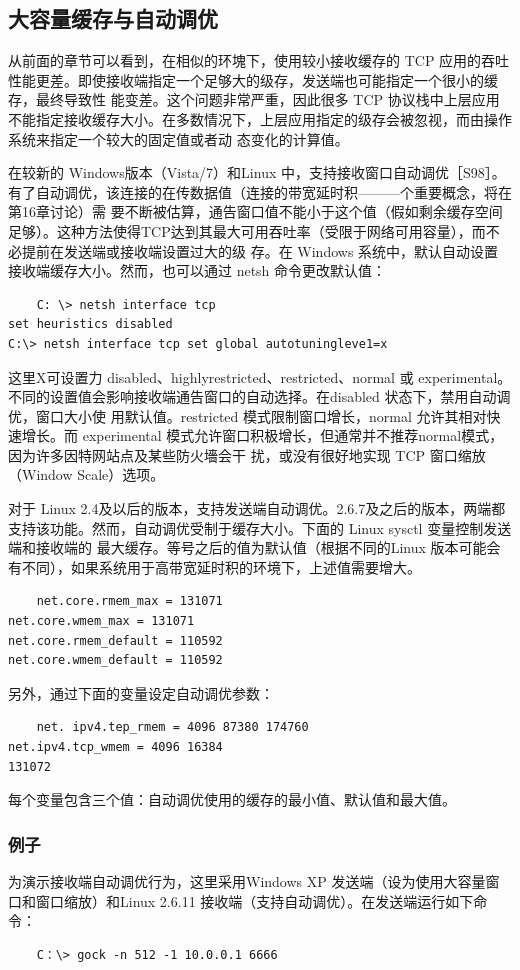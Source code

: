 \subsection{大容量缓存与自动调优}
从前面的章节可以看到，在相似的环塊下，使用较小接收缓存的 TCP 应用的吞吐性能更差。即使接收端指定一个足够大的级存，发送端也可能指定一个很小的缓存，最终导致性
能变差。这个问题非常严重，因此很多 TCP 协议栈中上层应用不能指定接收缓存大小。在多数情况下，上层应用指定的级存会被忽视，而由操作系统来指定一个较大的固定值或者动
态变化的计算值。

在较新的 Windows版本（Vista/7）和Linux 中，支持接收窗口自动调优［S98］。有了自动调优，该连接的在传数据值（连接的带宽延时积———个重要概念，将在第16章讨论）需
要不断被估算，通告窗口值不能小于这个值（假如剩余缓存空间足够）。这种方法使得TCP达到其最大可用吞吐率（受限于网络可用容量），而不必提前在发送端或接收端设置过大的级
存。在 Windows 系统中，默认自动设置接收端缓存大小。然而，也可以通过 netsh 命令更改默认值：
\begin{verbatim}
    C: \> netsh interface tcp
set heuristics disabled
C:\> netsh interface tcp set global autotuningleve1=x
\end{verbatim}

这里X可设置力 disabled、highlyrestricted、restricted、normal 或 experimental。不同的设置值会影响接收端通告窗口的自动选择。在disabled 状态下，禁用自动调优，窗口大小使
用默认值。restricted 模式限制窗口增长，normal 允许其相对快速增长。而 experimental 模式允许窗口积极增长，但通常并不推荐normal模式，因为许多因特网站点及某些防火墻会干
扰，或没有很好地实现 TCP 窗口缩放（Window Scale）选项。

对于 Linux 2.4及以后的版本，支持发送端自动调优。2.6.7及之后的版本，两端都支持该功能。然而，自动调优受制于缓存大小。下面的 Linux sysctl 变量控制发送端和接收端的
最大缓存。等号之后的值为默认值（根据不同的Linux 版本可能会有不同），如果系统用于高带宽延时积的环境下，上述值需要增大。

\begin{verbatim}
    net.core.rmem_max = 131071
net.core.wmem_max = 131071
net.core.rmem_default = 110592
net.core.wmem_default = 110592
\end{verbatim}

另外，通过下面的变量设定自动调优参数：
\begin{verbatim}
    net. ipv4.tep_rmem = 4096 87380 174760
net.ipv4.tcp_wmem = 4096 16384
131072
\end{verbatim}

每个变量包含三个值：自动调优使用的缓存的最小值、默认值和最大值。
\subsubsection{例子}
为演示接收端自动调优行为，这里采用Windows XP 发送端（设为使用大容量窗口和窗口缩放）和Linux 2.6.11 接收端（支持自动调优）。在发送端运行如下命令：
\begin{verbatim}
    C：\> gock -n 512 -1 10.0.0.1 6666
\end{verbatim}

